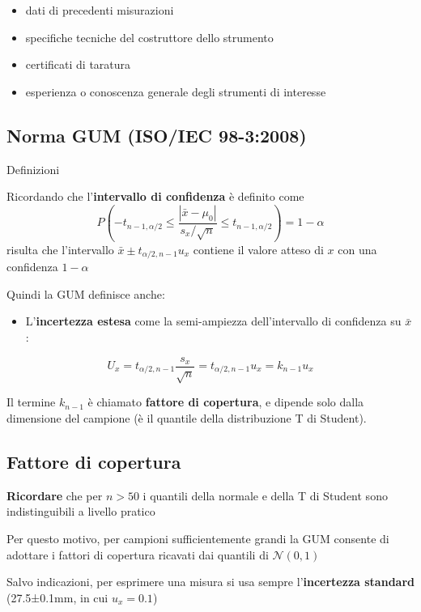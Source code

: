 \documentclass[
  letterpaper,
  DIV=11,
  numbers=noendperiod,
  oneside]{scrartcl}
\providecommand{\tightlist}{%
  \setlength{\itemsep}{0pt}\setlength{\parskip}{0pt}}
\begin{document}
\begin{itemize}
\tightlist
\item
  dati di precedenti misurazioni
\item
  specifiche tecniche del costruttore dello strumento
\item
  certificati di taratura
\item
  esperienza o conoscenza generale degli strumenti di interesse
\end{itemize}

\subsection{Norma GUM (ISO/IEC
98-3:2008)}\label{norma-gum-isoiec-98-32008-2}

Definizioni

Ricordando che l'\textbf{intervallo di confidenza} è definito come \[
P\left(-t_{n-1,\alpha/2}\leq\frac{|\bar x - \mu_0|}{s_x/\sqrt{n}}\leq t_{n-1,\alpha/2}\right) = 1-\alpha
\] risulta che l'intervallo \(\bar x \pm t_{\alpha/2,n-1}u_x\) contiene
il valore atteso di \(x\) con una confidenza \(1-\alpha\)

Quindi la GUM definisce anche:

\begin{itemize}
\tightlist
\item
  L'\textbf{incertezza estesa} come la semi-ampiezza dell'intervallo di
  confidenza su \(\bar x\):
\end{itemize}

\[
U_x=t_{\alpha/2,n-1}\frac{s_x}{\sqrt{n}}=t_{\alpha/2,n-1}u_x = k_{n-1}u_x
\]

Il termine \(k_{n-1}\) è chiamato \textbf{fattore di copertura}, e
dipende solo dalla dimensione del campione (è il quantile della
distribuzione T di Student).

\subsection{Fattore di copertura}\label{fattore-di-copertura}

\textbf{Ricordare} che per \(n>50\) i quantili della normale e della T
di Student sono indistinguibili a livello pratico

Per questo motivo, per campioni sufficientemente grandi la GUM consente
di adottare i fattori di copertura ricavati dai quantili di
\(\mathcal{N}(0,1)\)

Salvo indicazioni, per esprimere una misura si usa sempre
l'\textbf{incertezza standard} (27.5±0.1mm, in cui \(u_x=0.1\))
\end{document}
